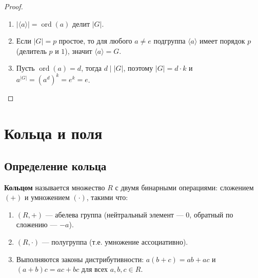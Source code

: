 \documentclass[10pt]{article}
\begin{document}
\begin{proof}
\begin{enumerate}
    \item $|\langle a \rangle| = \operatorname{ord}(a)$ делит $|G|$.
    \item Если $|G| = p$ простое, то для любого $a \neq e$ подгруппа $\langle a \rangle$ имеет порядок $p$ (делитель $p$ и $1$), значит $\langle a \rangle = G$.
    \item Пусть $\operatorname{ord}(a) = d$, тогда $d \mid |G|$, поэтому $|G| = d \cdot k$ и $a^{|G|} = (a^d)^k = e^k = e$.
\end{enumerate}
\end{proof}

\section{Кольца и поля}

\subsection{Определение кольца}
\begin{definition}
\textbf{Кольцом} называется множество $R$ с двумя бинарными операциями: сложением $(+)$ и умножением $(\cdot)$, такими что:
\begin{enumerate}
    \item $(R, +)$ — абелева группа (нейтральный элемент — $0$, обратный по сложению — $-a$).
    \item $(R, \cdot)$ — полугруппа (т.е. умножение ассоциативно).
    \item Выполняются законы дистрибутивности:
    $a(b+c) = ab + ac$ и $(a+b)c = ac + bc$ для всех $a,b,c \in R$.
\end{enumerate}
\end{definition}
\end{document}
